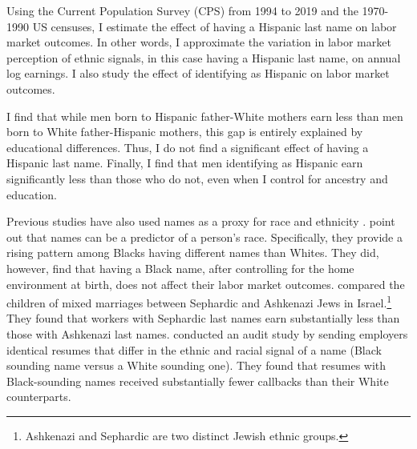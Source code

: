 \documentclass{wptemp}
\begin{document}
Using the Current Population Survey (CPS) from 1994 to 2019 and the 1970-1990 US censuses, I estimate the effect of having a Hispanic last name on labor market outcomes. In other words, I approximate the variation in labor market perception of ethnic signals, in this case having a Hispanic last name, on annual log earnings. I also study the effect of identifying as Hispanic on labor market outcomes. 

I find that while men born to Hispanic father-White mothers earn less than men born to White father-Hispanic mothers, this gap is entirely explained by educational differences. Thus, I do not find a significant effect of having a Hispanic last name. Finally, I find that men identifying as Hispanic earn significantly less than those who do not, even when I control for ancestry and education.



Previous studies have also used names as a proxy for race and ethnicity \citep{fryer2004causes, rubinstein2014pride, bertrand2004emily}. \citet{fryer2004causes} point out that names can be a predictor of a person's race. Specifically, they provide a rising pattern among Blacks having different names than Whites. They did, however, find that having a Black name, after controlling for the home environment at birth, does not affect their labor market outcomes. \citet{rubinstein2014pride} compared the children of mixed marriages between Sephardic and Ashkenazi Jews in Israel.\footnote{Ashkenazi and Sephardic are two distinct Jewish ethnic groups.} They found that workers with Sephardic last names earn substantially less than those with Ashkenazi last names. \citet{bertrand2004emily} conducted an audit study by sending employers identical resumes that differ in the ethnic and racial signal of a name (Black sounding name versus a White sounding one). They found that resumes with Black-sounding names received substantially fewer callbacks than their White counterparts. 
\end{document}
